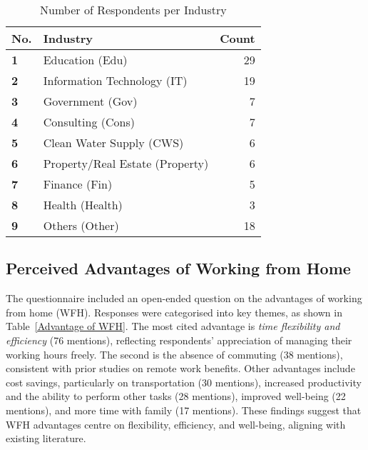 \documentclass[a4paper, conference]{IEEEtran}
\begin{document}
\begin{table}[ht]
	\caption{Number of Respondents per Industry}
	\label{Respondent Industry}
	\begin{tabular}{|p{}|p{}|r|}
		\cline{1-3}
		\textbf{No.} & \textbf{Industry}      & \textbf{Count}   \\ \hline
		\textbf{1}  & Education (Edu)     & 29            \\ \hline
		\textbf{2}  & Information Technology (IT)         & 19 \\ \hline %
		\textbf{3}  & Government (Gov)     & 7             \\ \hline
		\textbf{4}  & Consulting (Cons)     & 7 \\ \hline %
		\textbf{5}  & Clean Water Supply (CWS) & 6          \\   \hline
		\textbf{6}  & Property/Real Estate (Property)     & 6             \\ \hline
		\textbf{7}  & Finance (Fin)     & 5             \\ \hline
		\textbf{8}  & Health (Health)    & 3             \\ \hline
		\textbf{9}  & Others (Other)       & 18 %
		\\ \hline
	\end{tabular}
\end{table}

\subsection{Perceived Advantages of Working from Home}
\label{sec:advantage-wfh}

The questionnaire included an open-ended question on the advantages of working from home (WFH). Responses were categorised into key themes, as shown in Table~\ref{Advantage of WFH}. The most cited advantage is \textit{time flexibility and efficiency} (76 mentions), reflecting respondents' appreciation of managing their working hours freely. The second is the absence of commuting (38 mentions), consistent with prior studies on remote work benefits. Other advantages include cost savings, particularly on transportation (30 mentions), increased productivity and the ability to perform other tasks (28 mentions), improved well-being (22 mentions), and more time with family (17 mentions). These findings suggest that WFH advantages centre on flexibility, efficiency, and well-being, aligning with existing literature.
\end{document}
